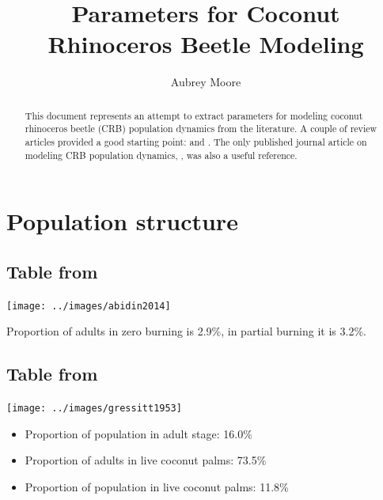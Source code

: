 \documentclass[12pt,letterpaper,english,bibliography=totocnumbered, abstract=on]{scrartcl}
\begin{document}
\title{Parameters for Coconut Rhinoceros Beetle Modeling}

\author{Aubrey Moore}

\maketitle
\newpage
\tableofcontents
\pagebreak

\begin{abstract}
	This document represents an attempt to extract parameters for modeling coconut rhinoceros beetle (CRB) population dynamics from the literature. A couple of review articles provided a good starting point: \cite{bedford_biology_1980} and \cite{pallipparambil_new_2015}. The only published journal article on modeling CRB population dynamics, \cite{hochberg_model_1991}, was also a useful reference. 
\end{abstract}

\section{Population structure}

\subsection{Table from \cite{abidin_population_2014}}
\begin{center}
	\texttt{[image: ../images/abidin2014]}
\end{center}

Proportion of adults in zero burning is 2.9\%, in partial burning it is 3.2\%.

\subsection{Table from \cite{gressitt_coconut_1953}}
\begin{center}
	\texttt{[image: ../images/gressitt1953]}
\end{center}

\begin{itemize}
	\item Proportion of population in adult stage: 16.0\%
	\item Proportion of adults in live coconut palms: 73.5\%
	\item Proportion of population in live coconut palms: 11.8\%
\end{itemize}
\end{document}

